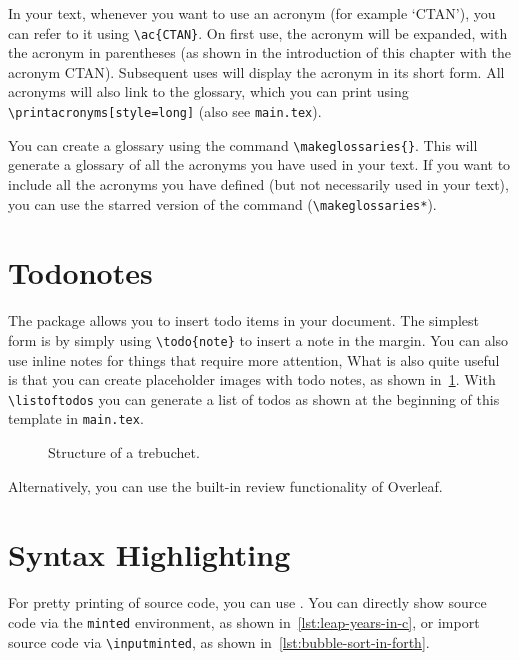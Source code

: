 In your text, whenever you want to use an acronym (for example `\ac{CTAN}'), you can refer to it using \verb|\ac{CTAN}|.
On first use, the acronym will be expanded, with the acronym in parentheses (as shown in the introduction of this chapter with the acronym \ac{CTAN}).
Subsequent uses will display the acronym in its short form.
All acronyms will also link to the glossary, which you can print using \verb|\printacronyms[style=long]| (also see \verb|main.tex|).

You can create a glossary using the command \verb|\makeglossaries{}|. This will generate a glossary of all the acronyms you have used in your text. If you want to include all the acronyms you have defined (but not necessarily used in your text), you can use the starred version of the command (\ie \verb|\makeglossaries*|).

\section{Todonotes}

The package  allows you to insert todo items in your document.
The simplest form is by simply using \verb+\todo{note}+ to insert a note in the margin.
You can also use inline notes for things that require more attention, 
What is also quite useful is that you can create placeholder images with todo notes, as shown in~\cref{fig:missing-figure}.
With \verb+\listoftodos+ you can generate a list of todos as shown at the beginning of this template in \verb+main.tex+.

\begin{figure}
    \centering
    \caption{Structure of a trebuchet.}
    \label{fig:missing-figure}
\end{figure}

Alternatively, you can use the built-in review functionality of Overleaf.

\section{Syntax Highlighting}
For pretty printing of source code, you can use .
You can directly show source code via the \verb|minted| environment, as shown in~\cref{lst:leap-years-in-c}, or import source code via \verb|\inputminted|, as shown in~\cref{lst:bubble-sort-in-forth}.

